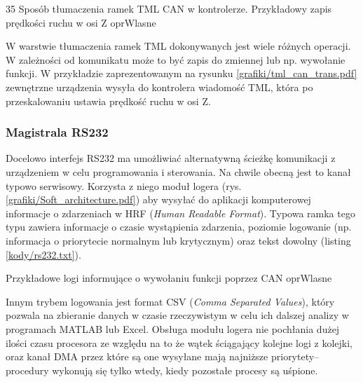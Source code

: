 	{35}
	{Sposób tłumaczenia ramek TML CAN w kontrolerze. Przykładowy zapis prędkości ruchu w osi Z}
	{oprWlasne}
	
W warstwie tłumaczenia ramek TML dokonywanych jest wiele różnych operacji. W zależności od komunikatu może to być zapis do zmiennej lub np. wywołanie funkcji. W przykładzie zaprezentowanym na rysunku \ref{grafiki/tml_can_trans.pdf} zewnętrzne urządzenia wysyła do kontrolera wiadomość TML, która po przeskalowaniu ustawia prędkość ruchu w osi Z.

\subsubsection{Magistrala RS232}

Docelowo interfejs RS232 ma umożliwiać alternatywną ścieżkę komunikacji z urządzeniem w celu programowania i sterowania. Na chwile obecną jest to kanał typowo serwisowy. Korzysta z niego moduł logera (rys. \ref{grafiki/Soft_architecture.pdf}) aby wysyłać do aplikacji komputerowej informacje o zdarzeniach w HRF ({\it Human Readable Format}). Typowa ramka tego typu zawiera informacje o czasie wystąpienia zdarzenia, poziomie logowanie (np. informacja o priorytecie normalnym lub krytycznym) oraz tekst dowolny (listing \ref{kody/rs232.txt}). 

		   {}
		   {Przykładowe logi informujące o wywołaniu funkcji poprzez CAN}
		   {oprWlasne}
		   
Innym trybem logowania jest format CSV ({\it Comma Separated Values}), który pozwala na zbieranie danych w czasie rzeczywistym w celu ich dalszej analizy w programach MATLAB lub Excel. Obsługa modułu logera nie pochłania dużej ilości czasu procesora ze względu na to że wątek ściągający kolejne logi z kolejki, oraz kanał DMA przez które są one wysyłane mają najniższe priorytety-- procedury wykonują się tylko wtedy, kiedy pozostałe procesy są uśpione.



\clearpage







